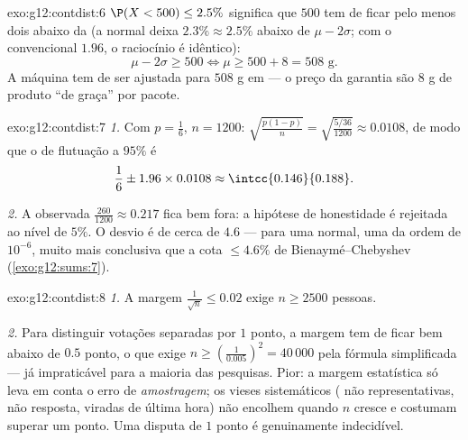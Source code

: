 \begin{solution}{exo:g12:contdist:6}
$\P(X < 500) \leq 2.5\%$ significa que $500$ tem de ficar pelo menos dois
 abaixo da  (a normal deixa $2.3\% \approx 2.5\%$
abaixo de $\mu - 2\sigma$; com o convencional $1.96$, o raciocínio é
idêntico):
\[
\mu - 2\sigma \geq 500 \iff \mu \geq 500 + 8 = 508 \text{ g}.
\]
A máquina tem de ser ajustada para $508$ g em  --- o preço da
garantia são $8$ g de produto ``de graça'' por pacote.
\end{solution}

\begin{solution}{exo:g12:contdist:7}
\emph{1.} Com $p = \frac16$, $n = 1200$:
$\sqrt{\frac{p(1-p)}{n}} = \sqrt{\frac{5/36}{1200}} \approx 0.0108$, de
modo que o  de flutuação a $95\%$ é
\[
\frac16 \pm 1.96 \times 0.0108 \approx \intcc{0.146}{0.188}.
\]

\emph{2.} A  observada $\frac{260}{1200} \approx 0.217$ fica bem
fora: a hipótese de honestidade é rejeitada ao nível de $5\%$. O desvio é
de cerca de $4.6$  --- para uma  normal, uma
 da ordem de $10^{-6}$, muito mais conclusiva que a cota
$\leq 4.6\%$ de Bienaymé--Chebyshev (\cref{exo:g12:sums:7}).
\end{solution}

\begin{solution}{exo:g12:contdist:8}
\emph{1.} A margem $\frac{1}{\sqrt n} \leq 0.02$ exige $n \geq 2500$
pessoas.

\emph{2.} Para distinguir votações separadas por $1$ ponto, a margem tem
de ficar bem abaixo de $0.5$ ponto, o que exige
$n \geq \left(\frac{1}{0.005}\right)^2 = 40\,000$ pela fórmula
simplificada --- já impraticável para a maioria das pesquisas. Pior: a
margem estatística só leva em conta o erro de \emph{amostragem}; os
vieses sistemáticos ( não representativas, não resposta, viradas
de última hora) não encolhem quando $n$ cresce e costumam superar um
ponto. Uma disputa de $1$ ponto é genuinamente indecidível.
\end{solution}

